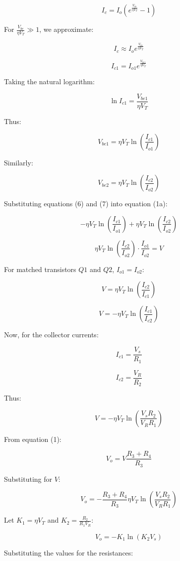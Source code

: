 \documentclass[a4paper,9pt,twoside,openany,twocolumn]{memoir}
\begin{document}
\[
I_c = I_o \left( e^{\frac{V_{be}}{\eta V_T}} - 1 \right) \tag{2}
\]

For \( \frac{V_{be}}{\eta V_T} \gg 1 \), we approximate:

\[
I_c \approx I_o e^{\frac{V_{be}}{\eta V_T}} \tag{3}
\]

\[
I_{c1} = I_{o1} e^{\frac{V_{be1}}{\eta V_T}} \tag{4}
\]

Taking the natural logarithm:

\[
\ln I_{c1} = \frac{V_{be1}}{\eta V_T} \tag{5}
\]

Thus:

\[
V_{be1} = \eta V_T \ln \left( \frac{I_{c1}}{I_{o1}} \right) \tag{6}
\]

Similarly:

\[
V_{be2} = \eta V_T \ln \left( \frac{I_{c2}}{I_{o2}} \right) \tag{7}
\]

Substituting equations (6) and (7) into equation (1a):

\[
-\eta V_T \ln \left( \frac{I_{c1}}{I_{o1}} \right) + \eta V_T \ln \left( \frac{I_{c2}}{I_{o2}} \right) \tag{8}
\]

\[
\eta V_T \ln \left( \frac{I_{c2}}{I_{o2}} \right) \cdot \frac{I_{o1}}{I_{o2}} = V \tag{9}
\]

For matched transistors \( Q1 \) and \( Q2 \), \( I_{o1} = I_{o2} \):

\[
V = \eta V_T \ln \left( \frac{I_{c2}}{I_{c1}} \right) \tag{10}
\]

\[
V = -\eta V_T \ln \left( \frac{I_{c1}}{I_{c2}} \right) \tag{11}
\]

Now, for the collector currents:

\[
I_{c1} = \frac{V_s}{R_1} \tag{12}
\]

\[
I_{c2} = \frac{V_R}{R_2} \tag{13}
\]

Thus:

\[
V = -\eta V_T \ln \left( \frac{V_s R_2}{V_R R_1} \right) \tag{14}
\]

From equation (1):

\[
V_o = V \frac{R_3 + R_4}{R_3} \tag{15}
\]

Substituting for \( V \):

\[
V_o = -\frac{R_3 + R_4}{R_3} \eta V_T \ln \left( \frac{V_s R_2}{V_R R_1} \right) \tag{16}
\]

Let \( K_1 = \eta V_T \) and \( K_2 = \frac{R_2}{R_1 V_R} \):

\[
V_o = -K_1 \ln \left( K_2 V_s \right) \tag{17}
\]

Substituting the values for the resistances:
\end{document}
